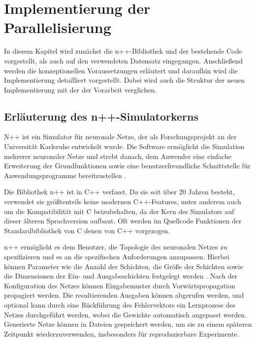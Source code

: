 \chapter{Implementierung der Parallelisierung}
\label{ch:Implementierung_Parallelisierung_Npp}

In diesem Kapitel wird zunächst die n++-Bibliothek und der bestehende Code vorgestellt, als auch auf den verwendeten Datensatz eingegangen. Anschließend werden die konzeptionellen Voraussetzungen erläutert und daraufhin wird die Implementierung detailliert vorgestellt. Dabei wird auch die Struktur der neuen Implementierung mit der der Vorarbeit verglichen.

\section{Erläuterung des n++-Simulatorkerns}
\label{sec:Erlauterung_Npp}
N++ ist ein Simulator für neuronale Netze, der als Forschungsprojekt an der Universität Karlsruhe entwickelt wurde. Die Software ermöglicht die Simulation mehrerer neuronaler Netze und strebt danach, dem Anwender eine einfache Erweiterung der Grundfunktionen sowie eine benutzerfreundliche Schnittstelle für Anwendungsprogramme bereitzustellen \citep{Riedmiller_RPROP}.

Die Bibliothek n++ ist in C++ verfasst. Da sie seit über 20 Jahren besteht, verwendet sie größtenteils keine modernen C++-Features, unter anderem auch um die Kompatibilität mit C beizubehalten, da der Kern des Simulators auf dieser älteren Sprachversion aufbaut. Oft werden im Quellcode Funktionen der Standardbibliothek von C denen von C++ vorgezogen.

n++ ermöglicht es dem Benutzer, die Topologie des neuronalen Netzes zu spezifizieren und es an die spezifischen Anforderungen anzupassen. Hierbei können Parameter wie die Anzahl der Schichten, die Größe der Schichten sowie die Dimensionen der Ein- und Ausgabeschichten festgelegt werden \citep{dokumentation_npp}. Nach der Konfiguration des Netzes können Eingabemuster durch Vorwärtspropagation propagiert werden. Die resultierenden Ausgaben können abgerufen werden, und optional kann durch eine Rückführung des Fehlervektors ein Lernprozess des Netzes durchgeführt werden, wobei die Gewichte automatisch angepasst werden. Generierte Netze können in Dateien gespeichert werden, um sie zu einem späteren Zeitpunkt wiederzuverwenden, insbesonders für reproduzierbare Experimente.

